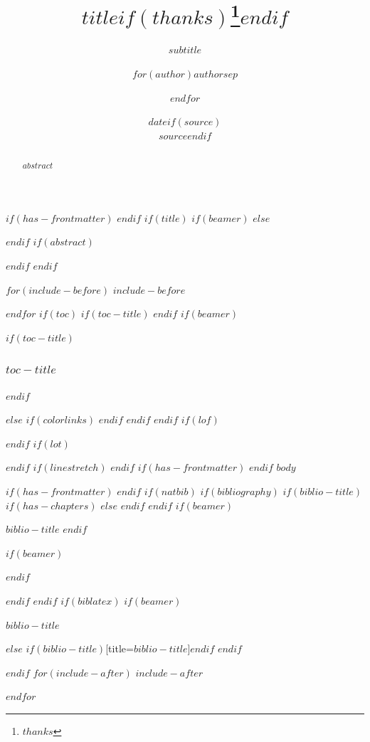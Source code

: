 \documentclass[
11pt,
$if(papersize)$
  $papersize$paper,
$endif$
$if(beamer)$
  ignorenonframetext,
$if(handout)$
  handout,
$endif$
$if(aspectratio)$
  aspectratio=$aspectratio$,
$endif$
$endif$
$for(classoption)$
  $classoption$$sep$,
$endfor$
]{$documentclass$}
\title{$title$$if(thanks)$\thanks{$thanks$}$endif$}
\subtitle{$subtitle$}
\author{$for(author)$$author$$sep$ \and $endfor$}
\date{$date$$if(source)$\\[1ex] \small $source$$endif$} %
\institute{$for(institute)$$institute$$sep$ \and $endfor$}
\newif\ifbibliography
\begin{document}
$if(has-frontmatter)$
\frontmatter
$endif$
$if(title)$
$if(beamer)$
\frame{\titlepage}
$else$
\maketitle
$endif$
$if(abstract)$
\begin{abstract}
$abstract$
\end{abstract}
$endif$
$endif$

$for(include-before)$
$include-before$

$endfor$
$if(toc)$
$if(toc-title)$
\renewcommand*\contentsname{$toc-title$}
$endif$
$if(beamer)$
\begin{frame}[allowframebreaks]
$if(toc-title)$
  \frametitle{$toc-title$}
$endif$
  \tableofcontents[hideallsubsections]
\end{frame}
$else$
{
$if(colorlinks)$
\hypersetup{linkcolor=$if(toccolor)$$toccolor$$else$$endif$}
$endif$
\setcounter{tocdepth}{$toc-depth$}
\tableofcontents
}
$endif$
$endif$
$if(lof)$
\listoffigures
$endif$
$if(lot)$
\listoftables
$endif$
$if(linestretch)$
$endif$
$if(has-frontmatter)$
\mainmatter
$endif$
$body$

$if(has-frontmatter)$
\backmatter
$endif$
$if(natbib)$
$if(bibliography)$
$if(biblio-title)$
$if(has-chapters)$
\renewcommand\bibname{$biblio-title$}
$else$
\renewcommand\refname{$biblio-title$}
$endif$
$endif$
$if(beamer)$
\begin{frame}[allowframebreaks]{$biblio-title$}
  \bibliographytrue
$endif$
  
$if(beamer)$
\end{frame}
$endif$

$endif$
$endif$
$if(biblatex)$
$if(beamer)$
\begin{frame}[allowframebreaks]{$biblio-title$}
  \bibliographytrue
  \printbibliography[heading=none]
\end{frame}
$else$
\printbibliography$if(biblio-title)$[title=$biblio-title$]$endif$
$endif$

$endif$
$for(include-after)$
$include-after$

$endfor$
\end{document}
